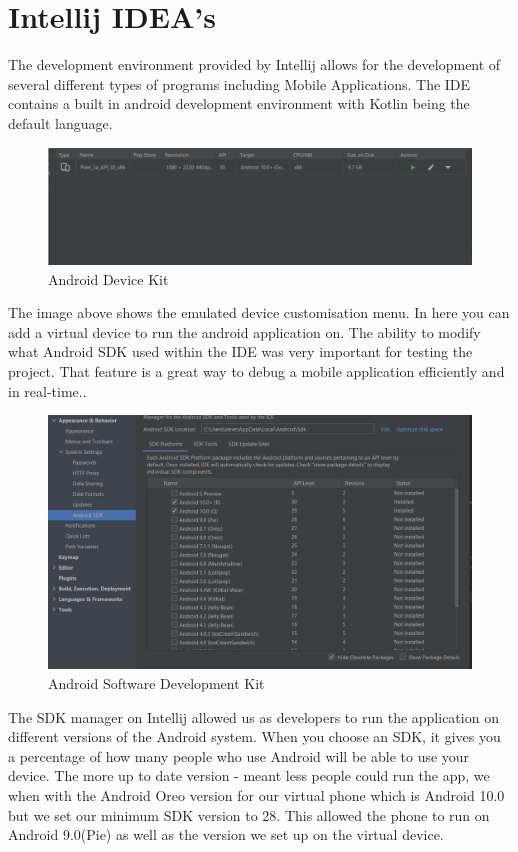 \section{Intellij IDEA's}
The development environment provided by Intellij allows for the development of several different types of programs including Mobile Applications. The IDE contains a built in android development environment with Kotlin being the default language.
\newline
\begin{figure}[H]
    \centering
    \includegraphics[width=15cm]{img/androidADK.PNG}
    \caption{Android Device Kit}
    \label{fig:adk menu}
\end{figure}
The image above shows the emulated device customisation menu. In here you can add a virtual device to run the android application on. The ability to modify what Android SDK used within the IDE was very important for testing the project. That feature is a great way to debug a mobile application efficiently and in real-time..
\begin{figure}[H]
    \centering
    \includegraphics[width=12cm]{img/androidSDK.PNG}
    \caption{Android Software Development Kit}
    \label{fig:sdk menu}
\end{figure}
The SDK manager on Intellij allowed us as developers to run the application on different versions of the Android system. When you choose an SDK, it gives you a percentage of how many people who use Android will be able to use your device. The more up to date version - meant less people could run the app, we when with the Android Oreo version for our virtual phone which is Android 10.0 but we set our minimum SDK version to 28. This allowed the phone to run on Android 9.0(Pie) as well as the version we set up on the virtual device.
